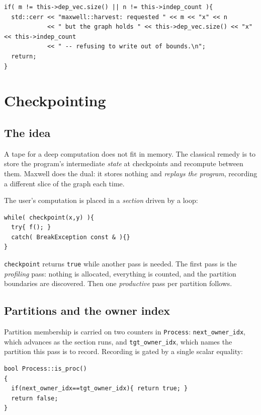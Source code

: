 \documentclass[11pt,a4paper]{report}
\newcommand{\code}[1]{\texttt{#1}}
\begin{document}
\begin{lstlisting}
if( m != this->dep_vec.size() || n != this->indep_count ){
  std::cerr << "maxwell::harvest: requested " << m << "x" << n
            << " but the graph holds " << this->dep_vec.size() << "x" << this->indep_count
            << " -- refusing to write out of bounds.\n";
  return;
}
\end{lstlisting}

\chapter{Checkpointing}
\label{ch:ckpt}

\section{The idea}

A tape for a deep computation does not fit in memory. The classical remedy is
to store the program's intermediate \emph{state} at checkpoints and recompute
between them. Maxwell does the dual: it stores nothing and \emph{replays the
program}, recording a different slice of the graph each time.

The user's computation is placed in a \emph{section} driven by a loop:

\begin{lstlisting}
while( checkpoint(x,y) ){
  try{ f(); }
  catch( BreakException const & ){}
}
\end{lstlisting}

\code{checkpoint} returns \code{true} while another pass is needed. The first
pass is the \emph{profiling} pass: nothing is allocated, everything is counted,
and the partition boundaries are discovered. Then one \emph{productive} pass per
partition follows.

\section{Partitions and the owner index}

Partition membership is carried on two counters in \code{Process}:
\code{next\_owner\_idx}, which advances as the section runs, and
\code{tgt\_owner\_idx}, which names the partition this pass is to record.
Recording is gated by a single scalar equality:

\begin{lstlisting}
bool Process::is_proc()
{
  if(next_owner_idx==tgt_owner_idx){ return true; }
  return false;
}
\end{lstlisting}
\end{document}
